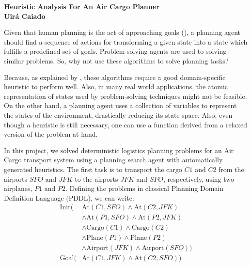 \documentclass[a4paper]{article}
\begin{document}

\begin{center}

{\bf \large Heuristic Analysis For An Air Cargo Planner \\ \small Uirá Caiado}
\end{center}



Given that human planning is the act of approaching goals (\cite{ushshaquestudy2015}), a planning agent should find a sequence of actions for transforming a given state into a state which fulfills a predefined set of goals. Problem-solving agents are used to solving similar problems. So, why not use these algorithms to solve planning tasks?

Because, as explained by \cite{russelartificial}, these algorithms require a good domain-specific heuristic to perform well. Also, in many real world applications, the atomic representation of states used by problem-solving techniques might not be feasible. On the other hand, a planning agent uses a collection of variables to represent the states of the environment, drastically reducing its state space. Also, even though a heuristic is still necessary, one can use a function derived from a relaxed version of the problem at hand.

In this project, we solved deterministic logistics planning problems for an Air Cargo transport system using a planning search agent with automatically generated heuristics. The first task is to transport the cargo $C1$ and $C2$ from the airports $SFO$ and $JFK$ to the airports $JFK$ and $SFO$, respectively, using two airplanes, $P1$ and $P2$. Defining the problems in classical Planning Domain Definition Language (PDDL), we can write:
\begin{equation*}
  \begin{aligned}
    \mbox{Init}(&\mbox{At}(C1, SFO) \wedge \mbox{At}(C2, JFK) \\
         &\wedge \mbox{At}(P1, SFO) \wedge \mbox{At}(P2, JFK) \\
         &\wedge \mbox{Cargo}(C1) \wedge \mbox{Cargo}(C2) \\
         &\wedge \mbox{Plane}(P1) \wedge \mbox{Plane}(P2) \\
         &\wedge \mbox{Airport}(JFK) \wedge \mbox{Airport}(SFO))\\
    \mbox{Goal}(&\mbox{At}(C1, JFK) \wedge \mbox{At}(C2, SFO))
  \end{aligned}
\end{equation*}
\end{document}
